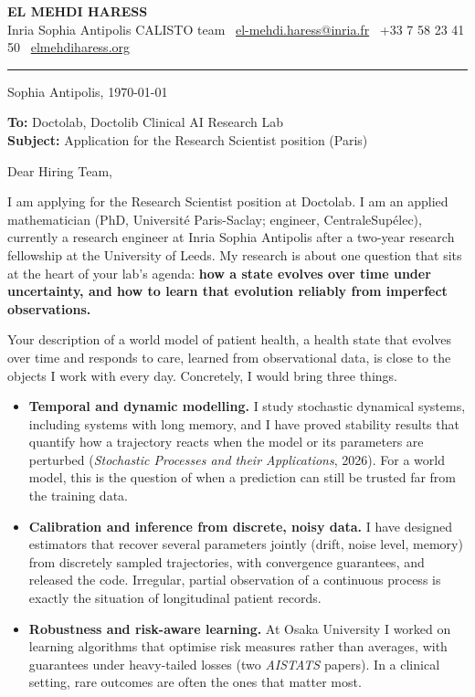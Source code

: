 \documentclass[11pt,a4paper]{article}
\makeatletter
\newcommand{\letterhead}{%
{\headingfont\bfseries\fontsize{16}{19}\selectfont EL MEHDI HARESS}\\[0.4ex]
{\footnotesize\color{muted}Inria Sophia Antipolis \textemdash{} CALISTO team\quad
\faEnvelope[regular]~\href{mailto:el-mehdi.haress@inria.fr}{el-mehdi.haress@inria.fr}\quad
\faPhone*~+33 7 58 23 41 50\quad
\faGlobe~\href{https://elmehdiharess.org}{elmehdiharess.org}}\\[-0.6ex]
{\color{rulegray}\rule{\linewidth}{0.7pt}}\par\vspace{1.2ex}}
\makeatother
\begin{document}
\letterhead

\begin{flushright}\small Sophia Antipolis, \today\end{flushright}

\textbf{To:} Doctolab, Doctolib Clinical AI Research Lab\\
\textbf{Subject:} Application for the Research Scientist position (Paris)

Dear Hiring Team,

I am applying for the Research Scientist position at Doctolab. I am an applied mathematician (PhD,
Université Paris-Saclay; engineer, CentraleSupélec), currently a research engineer at Inria Sophia
Antipolis after a two-year research fellowship at the University of Leeds. My research is about one
question that sits at the heart of your lab's agenda: \textbf{how a state evolves over time under
uncertainty, and how to learn that evolution reliably from imperfect observations.}

Your description of a world model of patient health, a health state that evolves over time and responds
to care, learned from observational data, is close to the objects I work with every day. Concretely, I
would bring three things.

\begin{itemize}
\item \textbf{Temporal and dynamic modelling.} I study stochastic dynamical systems, including systems
with long memory, and I have proved stability results that quantify how a trajectory reacts when the
model or its parameters are perturbed (\emph{Stochastic Processes and their Applications}, 2026). For a
world model, this is the question of when a prediction can still be trusted far from the training data.
\item \textbf{Calibration and inference from discrete, noisy data.} I have designed estimators that
recover several parameters jointly (drift, noise level, memory) from discretely sampled trajectories,
with convergence guarantees, and released the code. Irregular, partial observation of a continuous
process is exactly the situation of longitudinal patient records.
\item \textbf{Robustness and risk-aware learning.} At Osaka University I worked on learning algorithms
that optimise risk measures rather than averages, with guarantees under heavy-tailed losses (two
\emph{AISTATS} papers). In a clinical setting, rare outcomes are often the ones that matter most.
\end{itemize}
\end{document}
